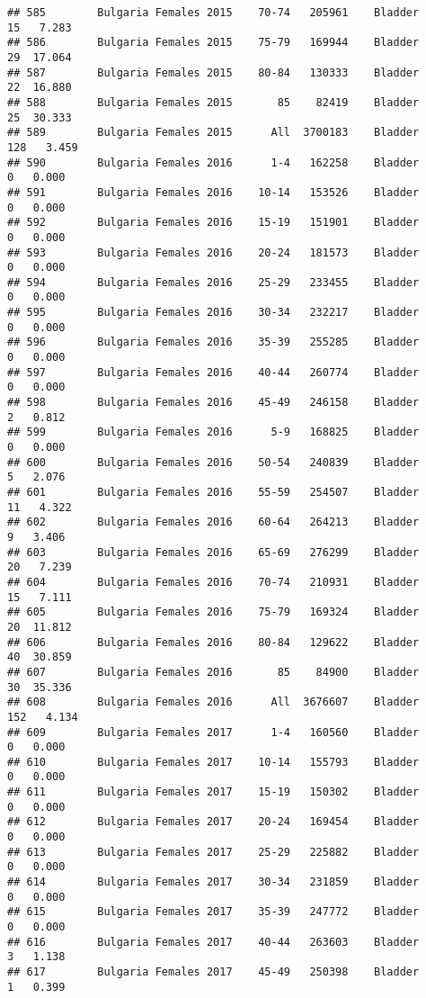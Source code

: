 \documentclass[
]{article}
\begin{document}
\begin{verbatim}
## 585        Bulgaria Females 2015    70-74   205961    Bladder     15   7.283
## 586        Bulgaria Females 2015    75-79   169944    Bladder     29  17.064
## 587        Bulgaria Females 2015    80-84   130333    Bladder     22  16.880
## 588        Bulgaria Females 2015       85    82419    Bladder     25  30.333
## 589        Bulgaria Females 2015      All  3700183    Bladder    128   3.459
## 590        Bulgaria Females 2016      1-4   162258    Bladder      0   0.000
## 591        Bulgaria Females 2016    10-14   153526    Bladder      0   0.000
## 592        Bulgaria Females 2016    15-19   151901    Bladder      0   0.000
## 593        Bulgaria Females 2016    20-24   181573    Bladder      0   0.000
## 594        Bulgaria Females 2016    25-29   233455    Bladder      0   0.000
## 595        Bulgaria Females 2016    30-34   232217    Bladder      0   0.000
## 596        Bulgaria Females 2016    35-39   255285    Bladder      0   0.000
## 597        Bulgaria Females 2016    40-44   260774    Bladder      0   0.000
## 598        Bulgaria Females 2016    45-49   246158    Bladder      2   0.812
## 599        Bulgaria Females 2016      5-9   168825    Bladder      0   0.000
## 600        Bulgaria Females 2016    50-54   240839    Bladder      5   2.076
## 601        Bulgaria Females 2016    55-59   254507    Bladder     11   4.322
## 602        Bulgaria Females 2016    60-64   264213    Bladder      9   3.406
## 603        Bulgaria Females 2016    65-69   276299    Bladder     20   7.239
## 604        Bulgaria Females 2016    70-74   210931    Bladder     15   7.111
## 605        Bulgaria Females 2016    75-79   169324    Bladder     20  11.812
## 606        Bulgaria Females 2016    80-84   129622    Bladder     40  30.859
## 607        Bulgaria Females 2016       85    84900    Bladder     30  35.336
## 608        Bulgaria Females 2016      All  3676607    Bladder    152   4.134
## 609        Bulgaria Females 2017      1-4   160560    Bladder      0   0.000
## 610        Bulgaria Females 2017    10-14   155793    Bladder      0   0.000
## 611        Bulgaria Females 2017    15-19   150302    Bladder      0   0.000
## 612        Bulgaria Females 2017    20-24   169454    Bladder      0   0.000
## 613        Bulgaria Females 2017    25-29   225882    Bladder      0   0.000
## 614        Bulgaria Females 2017    30-34   231859    Bladder      0   0.000
## 615        Bulgaria Females 2017    35-39   247772    Bladder      0   0.000
## 616        Bulgaria Females 2017    40-44   263603    Bladder      3   1.138
## 617        Bulgaria Females 2017    45-49   250398    Bladder      1   0.399

\end{verbatim}
\end{document}
